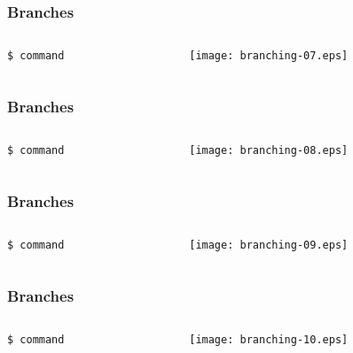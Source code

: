 \documentclass[english]{beamer}
\newcommand{\cmd}[1]{%
\texttt{\textcolor{code-orange}{#1}}%
}
\begin{document}
\begin{frame}
\frametitle{Branches}

\begin{columns}[t]
        \begin{column}[T]{.5\textwidth}
                \cmd{\$ command} \\
        \end{column}
        \begin{column}[T]{.5\textwidth}
                \texttt{[image: branching-07.eps]}
        \end{column}
\end{columns}
\end{frame}

\begin{frame}
\frametitle{Branches}

\begin{columns}[t]
        \begin{column}[T]{.5\textwidth}
                \cmd{\$ command} \\
        \end{column}
        \begin{column}[T]{.5\textwidth}
                \texttt{[image: branching-08.eps]}
        \end{column}
\end{columns}
\end{frame}

\begin{frame}
\frametitle{Branches}

\begin{columns}[t]
        \begin{column}[T]{.5\textwidth}
                \cmd{\$ command} \\
        \end{column}
        \begin{column}[T]{.5\textwidth}
                \texttt{[image: branching-09.eps]}
        \end{column}
\end{columns}
\end{frame}

\begin{frame}
\frametitle{Branches}

\begin{columns}[t]
        \begin{column}[T]{.5\textwidth}
                \cmd{\$ command} \\
        \end{column}
        \begin{column}[T]{.5\textwidth}
                \texttt{[image: branching-10.eps]}
        \end{column}
\end{columns}
\end{frame}
\end{document}
